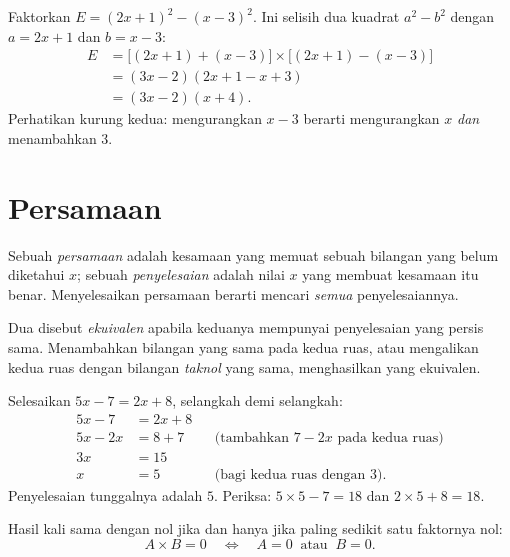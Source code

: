 \begin{example}\label{ex:g10:algebra:factorsteps}
Faktorkan $E = (2x + 1)^2 - (x - 3)^2$. Ini selisih dua kuadrat
$a^2 - b^2$ dengan $a = 2x+1$ dan $b = x-3$:
\begin{align*}
E &= \bigl[(2x+1) + (x-3)\bigr] \times \bigl[(2x+1) - (x-3)\bigr] \\
  &= (3x - 2)(2x + 1 - x + 3) \\
  &= (3x - 2)(x + 4).
\end{align*}
Perhatikan kurung kedua: mengurangkan $x - 3$ berarti mengurangkan $x$
\emph{dan} menambahkan $3$.
\end{example}

\section{Persamaan}

\begin{definition}\label{def:g10:algebra:equation}
Sebuah \emph{persamaan} adalah kesamaan yang memuat sebuah
bilangan yang belum diketahui $x$; sebuah \emph{penyelesaian} adalah nilai $x$
yang membuat kesamaan itu benar. Menyelesaikan persamaan berarti mencari
\emph{semua} penyelesaiannya.
\end{definition}

Dua  disebut \emph{ekuivalen} apabila keduanya mempunyai
penyelesaian yang persis sama. Menambahkan bilangan yang sama pada kedua
ruas, atau mengalikan kedua ruas dengan bilangan \emph{taknol} yang sama,
menghasilkan  yang ekuivalen.

\begin{example}\label{ex:g10:algebra:firstdegree}
Selesaikan $5x - 7 = 2x + 8$, selangkah demi selangkah:
\begin{align*}
5x - 7 &= 2x + 8 \\
5x - 2x &= 8 + 7 && \text{(tambahkan $7 - 2x$ pada kedua ruas)} \\
3x &= 15 \\
x &= 5 && \text{(bagi kedua ruas dengan $3$).}
\end{align*}
Penyelesaian tunggalnya adalah $5$. Periksa: $5 \times 5 - 7 = 18$ dan
$2 \times 5 + 8 = 18$.
\end{example}

\begin{theorem}\label{thm:g10:algebra:zeroproduct}
Hasil kali  sama dengan nol jika dan hanya jika paling sedikit
satu faktornya nol:
\[
A \times B = 0
\quad\Longleftrightarrow\quad
A = 0 \ \text{ atau } \ B = 0 .
\]
\end{theorem}

